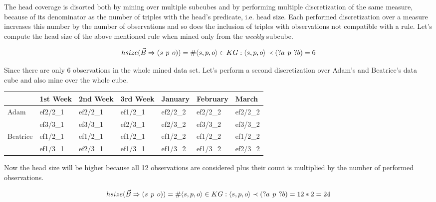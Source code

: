 The head coverage is disorted both by mining over multiple subcubes and by performing multiple discretization of the same measure, because of its denominator as the number of triples with the head's predicate, i.e. head size. Each performed discretization over a measure increases this number by the number of observations and so does the inclusion of triples with observations not compatible with a rule. Let's compute the head size of the above mentioned rule when mined only from the \textit{weekly} subcube.

$$
hsize(\vec{B} \Rightarrow (s\hspace{0.4em}p\hspace{0.4em}o)) = \# \langle s,p,o\rangle \in KG: \langle s,p,o\rangle \prec (?a\hspace{0.4em}p\hspace{0.4em}?b) = 6 
$$

Since there are only 6 observations in the whole mined data set. Let's perform a second discretization over Adam's and Beatrice's data cube and also mine over the whole cube. 

\begin{table}[h]
\centering
\begin{tabular}{l|llllll}
                          & 1st Week & 2nd Week & 3rd Week & January  & February & March     \\ 
\hline
\multirow{2}{*}{Adam}     & ef2/2\_1 & ef2/2\_1 & ef1/2\_1 & ef2/2\_2 & ef2/2\_2 & ef2/2\_2  \\
                          & ef3/3\_1 & ef3/3\_1 & ef2/3\_1 & ef2/3\_2 & ef3/3\_2 & ef3/3\_2  \\
\multirow{2}{*}{Beatrice} & ef1/2\_1 & ef1/2\_1 & ef1/2\_1 & ef1/2\_2 & ef1/2\_2 & ef1/2\_2  \\
                          & ef1/3\_1 & ef2/3\_1 & ef1/3\_1 & ef1/3\_2 & ef1/3\_2 & ef2/3\_2 
\end{tabular}
\end{table}

Now the head size will be higher because all 12 observations are considered plus their count is multiplied by the number of performed observations.

$$
hsize(\vec{B} \Rightarrow (s\hspace{0.4em}p\hspace{0.4em}o)) = \# \langle s,p,o\rangle \in KG: \langle s,p,o\rangle \prec (?a\hspace{0.4em}p\hspace{0.4em}?b) = 12 * 2 = 24
$$

